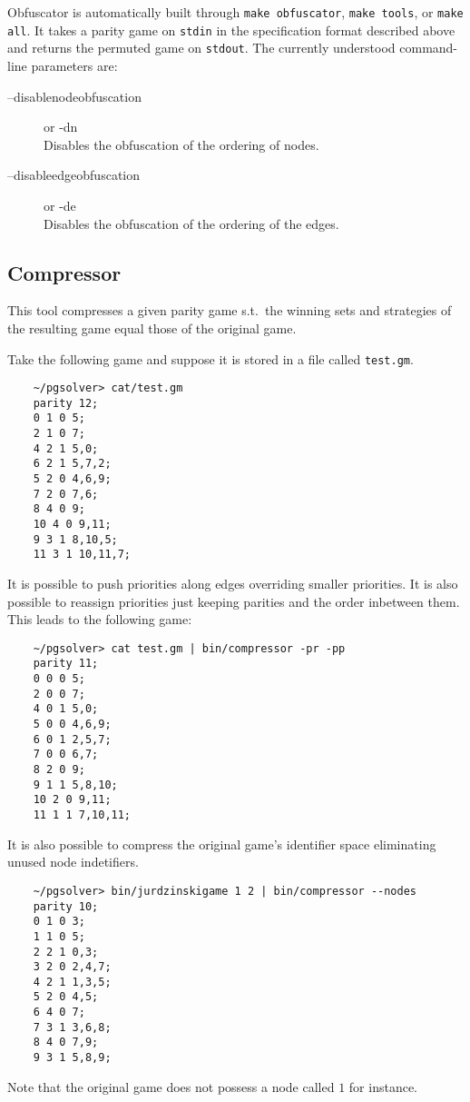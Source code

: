 Obfuscator is automatically built through \verb#make obfuscator#,
\verb#make tools#, or \verb#make all#.
It takes a parity game on \texttt{stdin} in the specification format described above
and returns the permuted game on \texttt{stdout}. The currently understood command-line
parameters are:
\begin{description}
\item[{\ttfamily --disablenodeobfuscation}] \enspace or {\ttfamily -dn} \\
	Disables the obfuscation of the ordering of nodes.

\item[{\ttfamily --disableedgeobfuscation}] \enspace or {\ttfamily -de} \\
    Disables the obfuscation of the ordering of the edges.
\end{description}



\subsection{Compressor}

This tool compresses a given parity game s.t.\ the winning sets and strategies of
the resulting game equal those of the original game.

\begin{example}
Take the following game and suppose it is stored in a file called \verb#test.gm#.
\begin{verbatim}
    ~/pgsolver> cat/test.gm
    parity 12;
    0 1 0 5;
    2 1 0 7;
    4 2 1 5,0;
    6 2 1 5,7,2;
    5 2 0 4,6,9;
    7 2 0 7,6;
    8 4 0 9;
    10 4 0 9,11;
    9 3 1 8,10,5;
    11 3 1 10,11,7;
\end{verbatim}
It is possible to push priorities along edges overriding smaller priorities. It is also possible
to reassign priorities just keeping parities and the order inbetween them. This leads to the
following game:
\begin{verbatim}
    ~/pgsolver> cat test.gm | bin/compressor -pr -pp
    parity 11;
    0 0 0 5;
    2 0 0 7;
    4 0 1 5,0;
    5 0 0 4,6,9;
    6 0 1 2,5,7;
    7 0 0 6,7;
    8 2 0 9;
    9 1 1 5,8,10;
    10 2 0 9,11;
    11 1 1 7,10,11;
\end{verbatim}
It is also possible to compress the original game's identifier space eliminating unused node indetifiers.
\begin{verbatim}
    ~/pgsolver> bin/jurdzinskigame 1 2 | bin/compressor --nodes
    parity 10;
    0 1 0 3;
    1 1 0 5;
    2 2 1 0,3;
    3 2 0 2,4,7;
    4 2 1 1,3,5;
    5 2 0 4,5;
    6 4 0 7;
    7 3 1 3,6,8;
    8 4 0 7,9;
    9 3 1 5,8,9;
\end{verbatim}
Note that the original game does not possess a node called $1$ for instance.
\end{example}

